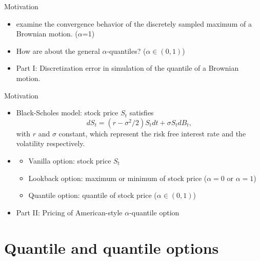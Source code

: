\documentclass[cjk,10pt]{beamer}
\begin{document}
\begin{frame}{Motivation}
\begin{itemize}
\item
\cite{A-G-P-1995} examine the convergence behavior of the discretely sampled maximum of a Brownian motion. ($\alpha$=1)
\item
How are about the general $\alpha$-quantiles? ($\alpha \in (0,1)$)
\item
Part I: Discretization error in simulation of the quantile of a Brownian motion.
\end{itemize}
\end{frame}

\begin{frame}{Motivation}
\begin{itemize}
\item
Black-Scholes model: stock price $S_t$ satisfies 
\begin{equation}\label{eq:1}
dS_t = (r-\sigma^2/2) S_tdt + \sigma S_tdB_t,
\end{equation}
with $r$ and $\sigma $ constant, which represent the risk free interest rate and the volatility respectively. 
\item
\begin{itemize}
\item
Vanilla option: stock price $S_t$
\item
Lookback option: maximum or minimum of stock price ($\alpha=0$ or $\alpha=1$)
\item
Quantile option: quantile of stock price ($\alpha \in (0,1)$)
\end{itemize}
\item
Part II: Pricing of American-style $\alpha$-quantile option
\end{itemize}
\end{frame}

\section{Quantile and quantile options}
\end{document}
